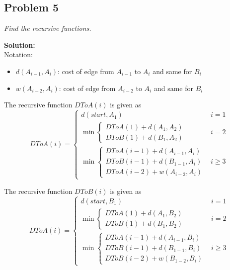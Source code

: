 \documentclass[12pt,a4paper]{article}
\newcommand{\solution}{\noindent\textbf{Solution:}\\\indent}
\begin{document}
\newpage
\subsection*{Problem 5}
\textit{
    Find the recursive functions.
}

\solution
Notation:
\begin{itemize}
    \item $d(A_{i-1}, A_i)$: cost of edge from $A_{i-1}$ to $A_i$ and same for $B_i$
    \item $w(A_{i-2}, A_i)$: cost of edge from $A_{i-2}$ to $A_i$ and same for $B_i$
\end{itemize}

The recursive function $DToA(i)$ is given as
\begin{equation}
    DToA(i) = 
    \begin{cases}
        d(start, A_1) & i=1 \\
        \min\begin{cases}
            DToA(1) + d(A_1, A_2) \\
            DToB(1) + d(B_1, A_2)
        \end{cases} & i=2 \\
        \min\begin{cases}
            DToA(i-1) + d(A_{i-1}, A_i) \\
            DToB(i-1) + d(B_{1-1}, A_i) \\
            DToA(i-2) + w(A_{i-2}, A_i)
        \end{cases} & i\geq3
    \end{cases}
\end{equation}

The recursive function $DToB(i)$ is given as
\begin{equation}
    DToA(i) = 
    \begin{cases}
        d(start, B_1) & i=1 \\
        \min\begin{cases}
            DToA(1) + d(A_1, B_2) \\
            DToB(1) + d(B_1, B_2)
        \end{cases} & i=2 \\
        \min\begin{cases}
            DToA(i-1) + d(A_{i-1}, B_i) \\
            DToB(i-1) + d(B_{1-1}, B_i) \\
            DToB(i-2) + w(B_{1-2}, B_i)
        \end{cases} & i\geq3
    \end{cases}
\end{equation}
\end{document}
